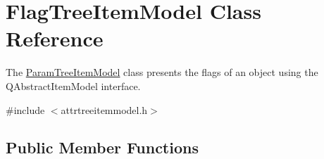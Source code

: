 \hypertarget{class_flag_tree_item_model}{\section{\-Flag\-Tree\-Item\-Model \-Class \-Reference}
\label{class_flag_tree_item_model}
}


\-The \hyperlink{class_param_tree_item_model}{\-Param\-Tree\-Item\-Model} class presents the flags of an object using the \-Q\-Abstract\-Item\-Model interface.  




{\ttfamily \#include $<$attrtreeitemmodel.\-h$>$}

\subsection*{\-Public \-Member \-Functions}
